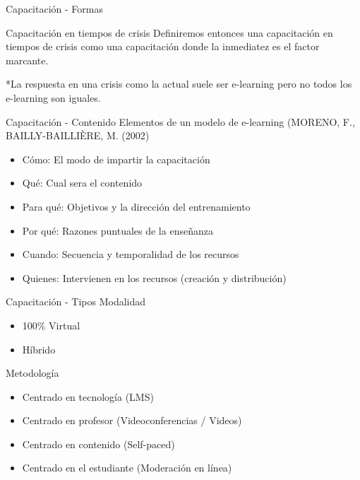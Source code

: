 \documentclass[aspectratio=169]{beamer}
\begin{document}
\begin{frame}[fragile]{Capacitación - Formas}
   \begin{exampleblock}{Capacitación en tiempos de crisis}
    Definiremos entonces una capacitación en tiempos de crisis como una capacitación donde la inmediatez es el factor marcante.
   \end{exampleblock}

*La respuesta en una crisis como la actual suele ser e-learning pero no todos los e-learning son iguales.
\end{frame}

\begin{frame}[fragile]{Capacitación - Contenido}
    Elementos de un modelo de e-learning (MORENO, F., BAILLY-BAILLIÈRE, M. (2002)
    \begin{itemize}
        \item Cómo: El modo de impartir la capacitación
        \item Qué: Cual sera el contenido
        \item Para qué: Objetivos y la dirección del entrenamiento
        \item Por qué: Razones puntuales de la enseñanza
        \item Cuando: Secuencia y temporalidad de los recursos
        \item Quienes: Intervienen en los recursos (creación y distribución) 
    \end{itemize}
\end{frame}

\begin{frame}[fragile]{Capacitación - Tipos}
    Modalidad
    \begin{itemize}
        \item 100\% Virtual
        \item Híbrido
    \end{itemize}

    Metodología
\begin{itemize}
    \item Centrado en tecnología (LMS)
    \item Centrado en profesor (Videoconferencias / Videos)
    \item Centrado en contenido (Self-paced)
    \item Centrado en el estudiante (Moderación en línea)
\end{itemize}
\end{frame}
\end{document}
